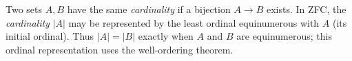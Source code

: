 
Two sets $A,B$ have the same \emph{cardinality} if a bijection $A\to B$ exists. In ZFC, the \emph{cardinality} $|A|$ may be represented by the least ordinal equinumerous with $A$ (its initial ordinal). Thus $|A|=|B|$ exactly when $A$ and $B$ are equinumerous; this ordinal representation uses the well-ordering theorem.
